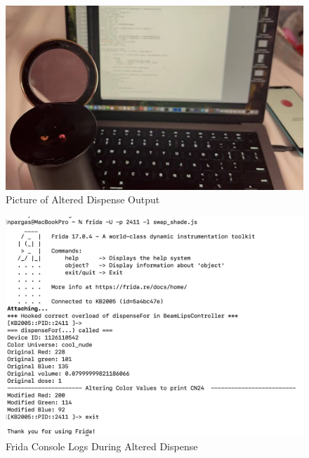\begin{figure}[H]
	\centering
	\includegraphics[scale=.7]{dispenseprint}
	\caption{Picture of Altered Dispense Output}
	\label{fig:dispenseprint}
\end{figure}
\begin{figure}[H]
	\centering
	\includegraphics[scale=.15]{swapshadefrida}
	\caption{Frida Console Logs During Altered Dispense}
	\label{fig:swapshadefrida}
\end{figure}

